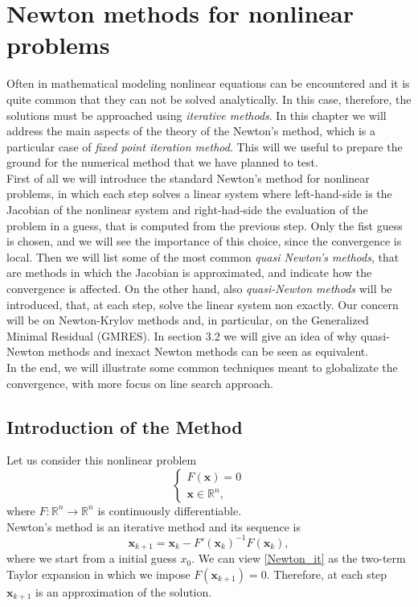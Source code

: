 \chapter{Newton methods for nonlinear problems}
Often in mathematical modeling nonlinear equations can be encountered and it is quite common that they can not be solved analytically. In this case, therefore, the solutions must be approached using \textit{iterative methods}.
In this chapter we will address the main aspects of the theory of the Newton's method, which is a particular case of \textit{fixed point iteration method}. This will we useful to prepare the ground for the numerical method that we have planned to test. \\
First of all we will introduce the standard Newton's method for nonlinear problems, in which each step solves a linear system where left-hand-side is the Jacobian of the nonlinear system and right-had-side the evaluation of the problem in a guess, that is computed from the previous step. Only the fist guess is chosen, and we will see the importance of this choice, since the convergence is local. Then we will list some of the most common \textit{quasi Newton's methods}, that are methods in which the Jacobian is approximated, and indicate how the convergence is affected. On the other hand, also \textit{quasi-Newton methods} will be introduced, that, at each step, solve the linear system non exactly. Our concern will be on Newton-Krylov methods and, in particular, on the Generalized Minimal Residual (GMRES). In section 3.2 we will give an idea of why quasi-Newton methods and inexact Newton methods can be seen as equivalent. \\
In the end, we will illustrate some common techniques meant to globalizate the convergence, with more focus on line search approach. 
 
\section{Introduction of the Method}
Let us consider this nonlinear problem 
\begin{equation*}
\begin{cases}
F(\textbf{x}) = 0\\\textbf{x} \in \mathbb{R}^n,
\end{cases}
\end{equation*}
where $F: \mathbb{R}^{n} \rightarrow \mathbb{R}^{n}$ is continuously differentiable.\\
Newton's method is an iterative method and its sequence is
\begin{equation}
{\textbf{x}}_{k+1} = {\textbf{x}}_{k} - F'({\textbf{x}}_{k})^{-1} F({\textbf{x}}_{k}), 
\label{Newton_it}
\end{equation}
where we start from a initial guess ${x}_{0}$. We can view \eqref{Newton_it} as the two-term Taylor expansion in which we impose $F({\textbf{x}}_{k+1})=0$.  Therefore, at each step $ \textbf{x}_{k+1} $ is an approximation of the solution.\\

